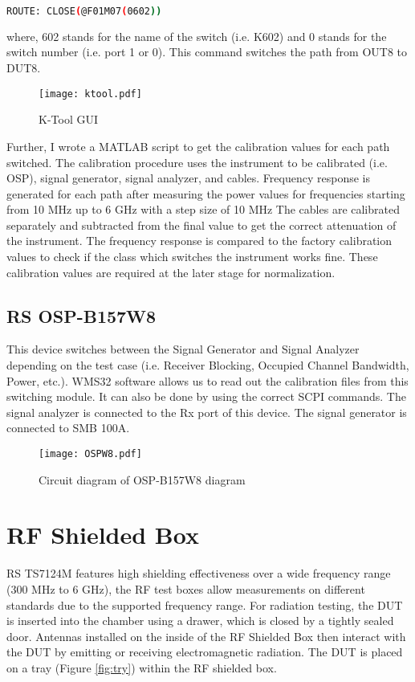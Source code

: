 \begin{lstlisting}[language=bash]
ROUTE: CLOSE(@F01M07(0602))
\end{lstlisting}

where, 602 stands for the name of the switch (i.e. K602) and 0 stands for the switch number (i.e. port 1 or 0). This command switches the path from OUT8 to DUT8. 

\begin{figure}[H]
\centering
\texttt{[image: ktool.pdf]}
\caption{K-Tool \acs{GUI}}
\label{fig:ktool}
\end{figure}

Further, I wrote a MATLAB\textregistered{} script to get the calibration values for each path switched. The calibration procedure uses the instrument to be calibrated (i.e. \acs{OSP}), signal generator, signal analyzer, and cables. Frequency response is generated for each path after measuring the power values for frequencies starting from 10 MHz up to 6 GHz with a step size of 10 MHz The cables are calibrated separately and subtracted from the final value to get the correct attenuation of the instrument. The frequency response is compared to the factory calibration values to check if the class which switches the instrument works fine. These calibration values are required at the later stage for normalization.

\subsection{\acs{RS}\textregistered{} \ac{OSP}-B157W8}
This device switches between the Signal Generator and Signal Analyzer depending on the test case (i.e. Receiver Blocking, Occupied Channel Bandwidth, Power, etc.). WMS32 software allows us to read out the calibration files from this switching module. It can also be done by using the correct \acs{SCPI} commands. The signal analyzer is connected to the Rx port of this device. The signal generator is connected to SMB 100A.

\begin{figure}[H]
\centering
\texttt{[image: OSPW8.pdf]}
\caption{Circuit diagram of \acs{OSP}-B157W8 diagram}
\label{fig:ospw8l}
\end{figure}



\section{\acs{RF} Shielded Box}
\acs{RS}\textregistered{} TS7124M features high shielding effectiveness over a wide frequency range (300 MHz to 6 GHz), the \acs{RF} test boxes allow measurements on different standards due to the supported frequency range. For radiation testing, the \acs{DUT} is inserted into the chamber using a drawer, which is closed by a tightly sealed door. Antennas installed on the inside of the \acs{RF} Shielded Box then interact with the \acs{DUT} by emitting or receiving electromagnetic radiation. The \acs{DUT} is placed on a tray (Figure \ref{fig:try}) within the \acs{RF} shielded box.

